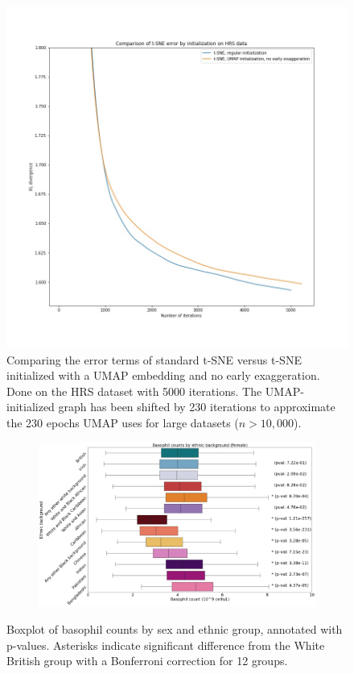 \documentclass[12pt]{pnas-new}
\begin{document}
\begin{figure}[!htb]
    \centering
    \includegraphics[width=0.95\columnwidth]{images/tsne_umap_graph_hrs.jpeg}
    \caption{Comparing the error terms of standard t-SNE versus t-SNE initialized with a UMAP embedding and no early exaggeration. Done on the HRS dataset with 5000 iterations. The UMAP-initialized graph has been shifted by 230 iterations to approximate the 230 epochs UMAP uses for large datasets ($n>10,000$).}
    \label{fig:supp_tsne_umap_compare_hrs_graph}
\end{figure}




\begin{figure}
    \centering
    \begin{subfigure}{\textwidth}
    \includegraphics[width=\textwidth]{images/female_basophill_boxplot_annotated.pdf}
    \end{subfigure}
    \caption{Boxplot of basophil counts by sex and ethnic group, annotated with p-values. Asterisks indicate significant difference from the White British group with a Bonferroni correction for 12 groups.}
    \label{fig:supp_box_basophill_f}
\end{figure}
\end{document}
